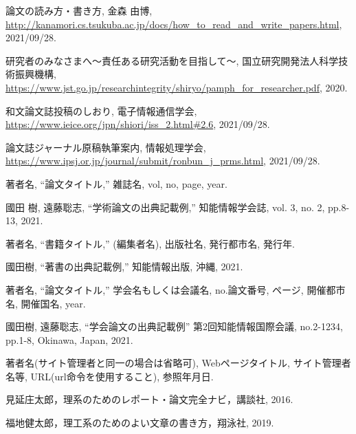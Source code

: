 \begin{thebibliography}{99}
論文の読み方・書き方, 金森 由博, \url{http://kanamori.cs.tsukuba.ac.jp/docs/how_to_read_and_write_papers.html}, 2021/09/28.

研究者のみなさまへ～責任ある研究活動を目指して～, 国立研究開発法人科学技術振興機構, \url{https://www.jst.go.jp/researchintegrity/shiryo/pamph_for_researcher.pdf}, 2020. 

和文論文誌投稿のしおり, 電子情報通信学会, \url{https://www.ieice.org/jpn/shiori/iss_2.html#2.6}, 2021/09/28.

論文誌ジャーナル原稿執筆案内, 情報処理学会, \url{https://www.ipsj.or.jp/journal/submit/ronbun_j_prms.html}, 2021/09/28.

著者名, ``論文タイトル,'' 雑誌名, vol, no, page, year.

國田 樹, 遠藤聡志, ``学術論文の出典記載例,'' 知能情報学会誌, vol. 3, no. 2, pp.8-13, 2021.

著者名, ``書籍タイトル,'' (編集者名), 出版社名, 発行都市名, 発行年.

國田樹, ``著書の出典記載例,'' 知能情報出版, 沖縄, 2021.

著者名, ``論文タイトル,'' 学会名もしくは会議名, no.論文番号, ページ, 開催都市名, 開催国名, year. 

國田樹, 遠藤聡志, ``学会論文の出典記載例'' 第2回知能情報国際会議, no.2-1234, pp.1-8, Okinawa, Japan, 2021. 

著者名(サイト管理者と同一の場合は省略可), Webページタイトル, サイト管理者名等, URL(url命令を使用すること), 参照年月日.  

見延庄太郎，理系のためのレポート・論文完全ナビ，講談社, 2016.

福地健太郎，理工系のためのよい文章の書き方，翔泳社, 2019.

\end{thebibliography}
